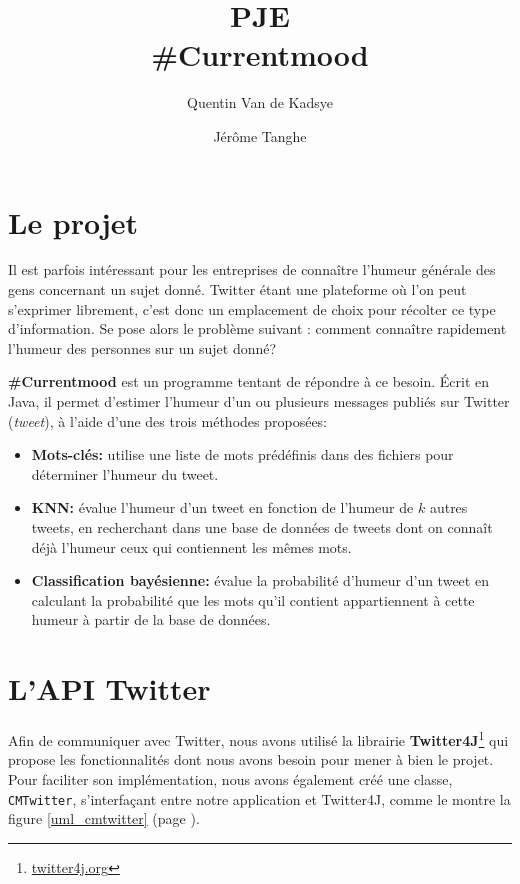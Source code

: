\documentclass[12pt,a4paper]{report}
\title{PJE\\\#Currentmood}
\author{Quentin Van de Kadsye \and Jérôme Tanghe}
\begin{document}
\maketitle

\tableofcontents


\chapter{Le projet}

Il est parfois intéressant pour les entreprises de connaître l'humeur générale
des gens concernant un sujet donné. Twitter étant une plateforme où l'on peut
s'exprimer librement, c'est donc un emplacement de choix pour récolter ce type
d'information. Se pose alors le problème suivant : comment connaître rapidement
l'humeur des personnes sur un sujet donné?

\textbf{\#Currentmood} est un programme tentant de répondre à ce besoin. Écrit
en Java, il permet d'estimer l'humeur d'un ou plusieurs messages publiés sur
Twitter (\textit{tweet}), à l'aide d'une des trois méthodes proposées:

\begin{itemize}
    \item
        \textbf{Mots-clés:} utilise une liste de mots prédéfinis dans des
        fichiers pour déterminer l'humeur du tweet.
    \item
        \textbf{KNN:} évalue l'humeur d'un tweet en fonction de l'humeur de $k$
        autres tweets, en recherchant dans une base de données de tweets dont on
        connaît déjà l'humeur ceux qui contiennent les mêmes mots.
    \item
        \textbf{Classification bayésienne:} évalue la probabilité d'humeur d'un
        tweet en calculant la probabilité que les mots qu'il contient
        appartiennent à cette humeur à partir de la base de données.
\end{itemize}


\chapter{L'API Twitter}

Afin de communiquer avec Twitter, nous avons utilisé la librairie
\textbf{Twitter4J}\footnote{\href{http://twitter4j.org}{twitter4j.org}} qui
propose les fonctionnalités dont nous avons besoin pour mener à bien le projet.
Pour faciliter son implémentation, nous avons également créé une classe,
\texttt{CMTwitter}, s'interfaçant entre notre application et Twitter4J, comme le
montre la figure \ref{uml_cmtwitter} (page \pageref{uml_cmtwitter}).
\end{document}
